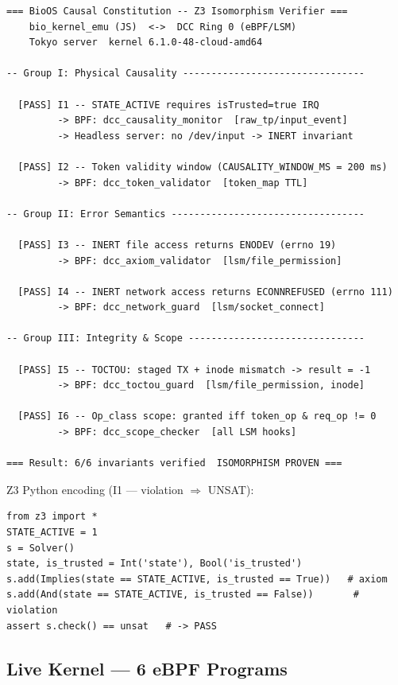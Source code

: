 \documentclass[11pt,a4paper,twoside]{article}
\begin{document}
\begin{lstlisting}[style=shellstyle,caption={Z3 verifier output (Tokyo server, Z3 4.16.0)}]
=== BioOS Causal Constitution -- Z3 Isomorphism Verifier ===
    bio_kernel_emu (JS)  <->  DCC Ring 0 (eBPF/LSM)
    Tokyo server  kernel 6.1.0-48-cloud-amd64

-- Group I: Physical Causality --------------------------------

  [PASS] I1 -- STATE_ACTIVE requires isTrusted=true IRQ
         -> BPF: dcc_causality_monitor  [raw_tp/input_event]
         -> Headless server: no /dev/input -> INERT invariant

  [PASS] I2 -- Token validity window (CAUSALITY_WINDOW_MS = 200 ms)
         -> BPF: dcc_token_validator  [token_map TTL]

-- Group II: Error Semantics ----------------------------------

  [PASS] I3 -- INERT file access returns ENODEV (errno 19)
         -> BPF: dcc_axiom_validator  [lsm/file_permission]

  [PASS] I4 -- INERT network access returns ECONNREFUSED (errno 111)
         -> BPF: dcc_network_guard  [lsm/socket_connect]

-- Group III: Integrity & Scope -------------------------------

  [PASS] I5 -- TOCTOU: staged TX + inode mismatch -> result = -1
         -> BPF: dcc_toctou_guard  [lsm/file_permission, inode]

  [PASS] I6 -- Op_class scope: granted iff token_op & req_op != 0
         -> BPF: dcc_scope_checker  [all LSM hooks]

=== Result: 6/6 invariants verified  ISOMORPHISM PROVEN ===
\end{lstlisting}

\noindent Z3 Python encoding (I1 --- violation $\Rightarrow$ UNSAT):

\begin{lstlisting}[style=pythonstyle]
from z3 import *
STATE_ACTIVE = 1
s = Solver()
state, is_trusted = Int('state'), Bool('is_trusted')
s.add(Implies(state == STATE_ACTIVE, is_trusted == True))   # axiom
s.add(And(state == STATE_ACTIVE, is_trusted == False))       # violation
assert s.check() == unsat   # -> PASS
\end{lstlisting}

\subsection{Live Kernel --- 6 eBPF Programs}
\end{document}
